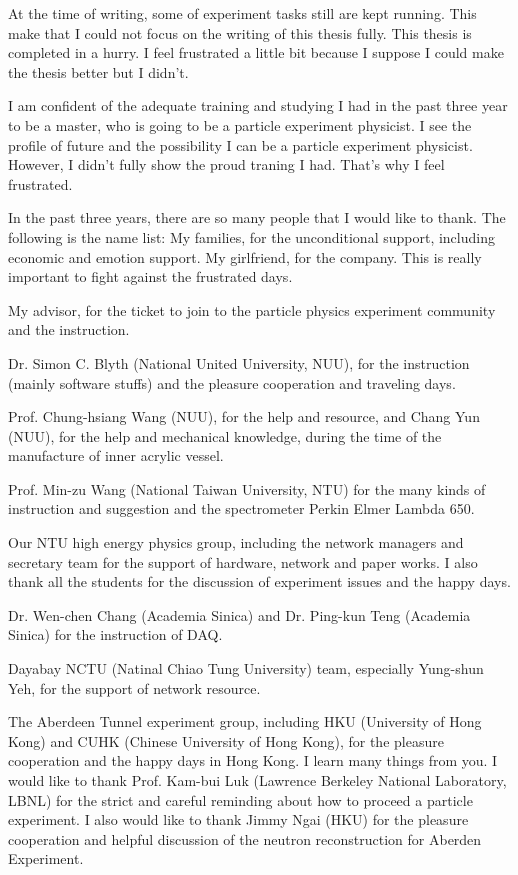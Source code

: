\begin{acknowledgements}

At the time of writing, some of experiment tasks still are kept running.
This make that I could not focus on the writing of this thesis fully.
This thesis is completed in a hurry. I feel frustrated a little bit because I suppose
I could make the thesis better but I didn't.

I am confident of the adequate training and studying I had in the past three year
to be a master, who is going to be a particle experiment physicist.
I see the profile of future and the possibility I can be a particle experiment physicist.
However, I didn't fully show the proud traning I had. That's why I feel frustrated.


In the past three years, there are so many people that I would like to thank.
The following is the name list:
My families, for the unconditional support, including
economic and emotion support.
My girlfriend, for the company. This is really important
to fight against the frustrated days.

My advisor, for the ticket to join to the particle physics
experiment community and the instruction.

Dr. Simon C. Blyth (National United University, NUU), for the instruction (mainly software stuffs) and the
pleasure cooperation and traveling days.

Prof. Chung-hsiang Wang (NUU), for the help and resource,
and Chang Yun (NUU), for the help and mechanical knowledge, during the time of
the manufacture of inner acrylic vessel.

Prof. Min-zu Wang (National Taiwan University, NTU) for the many kinds of instruction and suggestion
and the spectrometer Perkin Elmer Lambda 650.

Our NTU high energy physics group, including the network managers and secretary team
for the support of hardware, network and paper works. I also thank all
the students for the discussion of experiment issues and the happy days.

Dr. Wen-chen Chang (Academia Sinica) and Dr. Ping-kun Teng (Academia Sinica)
for the instruction of DAQ.

Dayabay NCTU (Natinal Chiao Tung University) team, especially Yung-shun Yeh, for the support of network resource.

The Aberdeen Tunnel experiment group, including HKU (University of Hong Kong) and CUHK (Chinese University of Hong Kong),
for the pleasure cooperation and the happy days in Hong Kong. I learn many things from you.
I would like to thank Prof. Kam-bui Luk (Lawrence Berkeley National Laboratory, LBNL) for the strict and careful reminding about
how to proceed a particle experiment. I also would like to thank Jimmy Ngai (HKU) for the
pleasure cooperation and helpful discussion of the neutron reconstruction for Aberden Experiment.


\end{acknowledgements}
